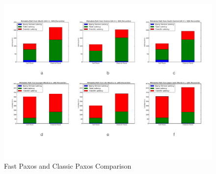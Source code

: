 \begin{figure}[t]
      \includegraphics[width=\linewidth]{images/Metadata_vs}
      \caption{Fast Paxos and Classic Paxos Comparison}
      \label{fig:metadata}
\end{figure}
